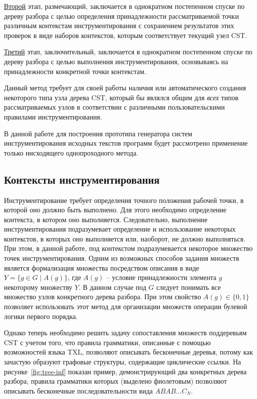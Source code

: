 \underline{Второй} этап, размечающий, заключается в однократном постепенном спуске по дереву разбора с целью определения принадлежности рассматриваемой точки различным контекстам инструментирования с сохранением результатов этих проверок в виде наборов контекстов, которым соответствует текущий узел CST.

\underline{Третий} этап, заключительный, заключается в однократном постепенном спуске по дереву разбора с целью выполнения инструментирования, основываясь на принадлежности конкретной точки контекстам.

Данный метод требует для своей работы наличия или автоматического создания некоторого типа узла дерева CST, который бы являлся общим для \textit{всех} типов рассматриваемых узлов в соответствии с различными пользовательскими правилами инструментирования.

В данной работе для построения прототипа генератора систем инструментирования исходных текстов программ будет рассмотрено применение только нисходящего однопроходного метода.

\subsection{Контексты инструментирования}

Инструментирование требует определения точного положения рабочей точки, в которой оно должно быть выполнено.
Для этого необходимо определение контекста, в котором оно выполняется.
Следовательно, выполнение инструментирования подразумевает определение и использование некоторых контекстов, в которых оно выполняется или, наоборот, не должно выполняться.
При этом, в данной работе, под контекстом подразумевается некоторое множество точек инструментирования.
Одним из возможных способов задания множеств является формализация множества посредством описания в виде $Y = \{g \in G \mid A(g) \}$, где $A(g)$ -- условие принадлежности элемента $g$ некоторому множеству $Y$.
В данном случае под $G$ следует понимать все множество узлов конкретного дерева разбора.
При этом свойство $A(g) \in \{0, 1\}$ позволяет использовать этот метод для организации множеств операции булевой логики первого порядка.

Однако теперь необходимо решить задачу сопоставления множеств поддеревьям CST с учетом того, что правила грамматики, описанные с помощью возможностей языка TXL, позволяют описывать бесконечные деревья, потому как зачастую образуют графовые структуры, содержащие циклические ссылки.
На рисунке~\ref{fig:tree-inf} показан пример, демонстрирующий два конкретных дерева разбора, правила грамматики которых (выделено фиолетовым) позволяют описывать бесконечные последовательности вида $ABAB ... {C_N}$.

